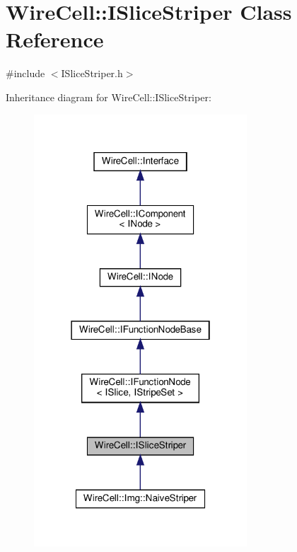 \hypertarget{class_wire_cell_1_1_i_slice_striper}{}\section{Wire\+Cell\+:\+:I\+Slice\+Striper Class Reference}
\label{class_wire_cell_1_1_i_slice_striper}


{\ttfamily \#include $<$I\+Slice\+Striper.\+h$>$}



Inheritance diagram for Wire\+Cell\+:\+:I\+Slice\+Striper\+:
\nopagebreak
\begin{figure}[H]
\begin{center}
\leavevmode
\includegraphics[width=226pt]{class_wire_cell_1_1_i_slice_striper__inherit__graph}
\end{center}
\end{figure}


